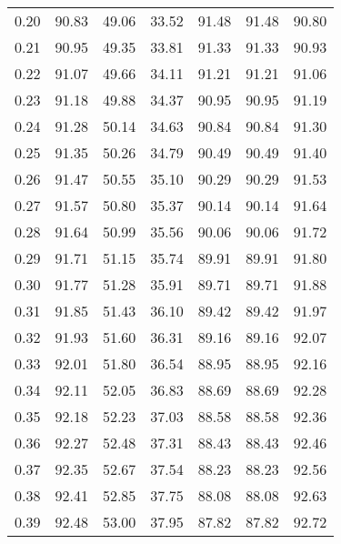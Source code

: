 \begin{tabular}{|c|c|c|c|c|c|c|}
      0.20 &     90.83 &     49.06 &      33.52 &   91.48 &      91.48 &         90.80 \\
      0.21 &     90.95 &     49.35 &      33.81 &   91.33 &      91.33 &         90.93 \\
      0.22 &     91.07 &     49.66 &      34.11 &   91.21 &      91.21 &         91.06 \\
      0.23 &     91.18 &     49.88 &      34.37 &   90.95 &      90.95 &         91.19 \\
      0.24 &     91.28 &     50.14 &      34.63 &   90.84 &      90.84 &         91.30 \\
      0.25 &     91.35 &     50.26 &      34.79 &   90.49 &      90.49 &         91.40 \\
      0.26 &     91.47 &     50.55 &      35.10 &   90.29 &      90.29 &         91.53 \\
      0.27 &     91.57 &     50.80 &      35.37 &   90.14 &      90.14 &         91.64 \\
      0.28 &     91.64 &     50.99 &      35.56 &   90.06 &      90.06 &         91.72 \\
      0.29 &     91.71 &     51.15 &      35.74 &   89.91 &      89.91 &         91.80 \\
      0.30 &     91.77 &     51.28 &      35.91 &   89.71 &      89.71 &         91.88 \\
      0.31 &     91.85 &     51.43 &      36.10 &   89.42 &      89.42 &         91.97 \\
      0.32 &     91.93 &     51.60 &      36.31 &   89.16 &      89.16 &         92.07 \\
      0.33 &     92.01 &     51.80 &      36.54 &   88.95 &      88.95 &         92.16 \\
      0.34 &     92.11 &     52.05 &      36.83 &   88.69 &      88.69 &         92.28 \\
      0.35 &     92.18 &     52.23 &      37.03 &   88.58 &      88.58 &         92.36 \\
      0.36 &     92.27 &     52.48 &      37.31 &   88.43 &      88.43 &         92.46 \\
      0.37 &     92.35 &     52.67 &      37.54 &   88.23 &      88.23 &         92.56 \\
      0.38 &     92.41 &     52.85 &      37.75 &   88.08 &      88.08 &         92.63 \\
      0.39 &     92.48 &     53.00 &      37.95 &   87.82 &      87.82 &         92.72 \\

\end{tabular}
